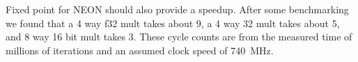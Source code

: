 \documentclass[final]{article}
\begin{document}
Fixed point for NEON should also provide a speedup.
After some benchmarking we found that a 4 way f32 mult takes about \SI{9}{\cycles}, a 4 way 32 mult takes about \SI{5}{\cycles}, and 8 way 16 bit mult takes \SI{3}{\cycles}.
These cycle counts are from the measured time of millions of iterations and an assumed clock speed of \SI{740}{\mega\hertz}.
\end{document}
